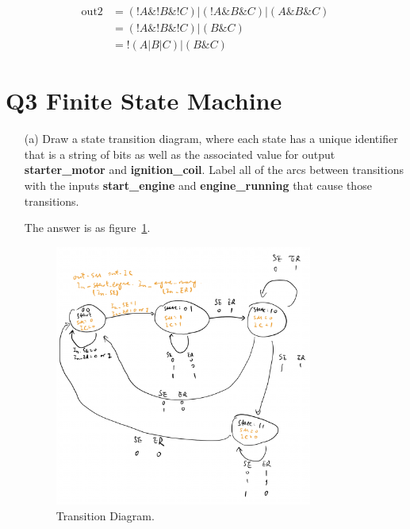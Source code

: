 \documentclass{article}
\theoremstyle{remark}
\theoremstyle{definition}
\begin{document}
\begin{enumerate}
        $$
        \begin{aligned}
            \text{out2} &= \left( !A \& !B \& !C \right) | \left( !A \& B \& C \right) | \left( A \& B \& C \right) \\
            &= \left( !A \& !B \& !C \right) | \left( B \& C \right) \\
            &= !\left( A|B|C \right) | \left( B \& C \right)
        \end{aligned}
        $$

    \end{enumerate}


    \section{Q3 Finite State Machine}
    \begin{enumerate}
        \item[(a)] Draw a state transition diagram, where each state has a unique identifier that is a string of bits as well as the associated value for output \textbf{starter\_motor} and \textbf{ignition\_coil}. Label all of the arcs between transitions with the inputs \textbf{start\_engine} and \textbf{engine\_running} that cause those transitions.

        The answer is as figure~\ref{fig:diag}.
        \begin{figure}[!htbp]
            \centering
            \includegraphics[width=0.8\textwidth]{img/diagram.png}
            \caption{Transition Diagram.}
            \label{fig:diag}
        \end{figure}


\end{enumerate}
\end{document}

